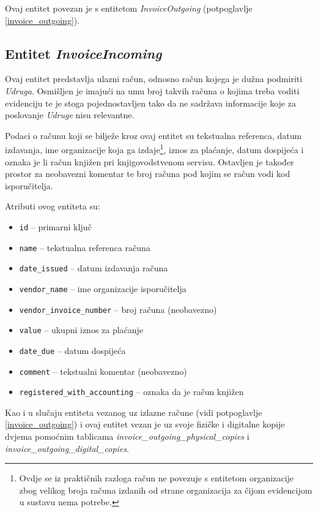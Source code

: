 \documentclass[times, utf8, diplomski]{fer}
\begin{document}
Ovaj entitet povezan je s entitetom \emph{InvoiceOutgoing} (potpoglavlje
\ref{invoice_outgoing}).

\subsection{Entitet \emph{InvoiceIncoming}} \label{invoice_incoming}

Ovaj entitet predstavlja ulazni račun, odnosno račun kojega je dužna podmiriti
\emph{Udruga}. Osmišljen je imajući na umu broj takvih računa o kojima treba
voditi evidenciju te je stoga pojednostavljen tako da ne sadržava informacije
koje za poslovanje \emph{Udruge} nisu relevantne.

Podaci o računu koji se bilježe kroz ovaj entitet su tekstualna referenca, datum
izdavanja, ime organizacije koja ga izdaje\footnote{Ovdje se iz praktičnih
    razloga račun ne povezuje s entitetom organizacije zbog velikog broja računa
    izdanih od strane organizacija za čijom evidencijom u sustavu nema potrebe.},
iznos za plaćanje, datum dospijeća i oznaka je li račun
knjižen pri knjigovodstvenom servisu. Ostavljen je također prostor za neobavezni
komentar te broj računa pod kojim se račun vodi kod isporučitelja.

\medskip
Atributi ovog entiteta su:
\begin{itemize}
    \item \texttt{id} -- primarni ključ
    \item \texttt{name} -- tekstualna referenca računa
    \item \texttt{date\_issued} -- datum izdavanja računa
    \item \texttt{vendor\_name} -- ime organizacije isporučitelja
    \item \texttt{vendor\_invoice\_number} -- broj računa (neobavezno)
    \item \texttt{value} -- ukupni iznos za plaćanje
    \item \texttt{date\_due} -- datum dospijeća
    \item \texttt{comment} -- tekstualni komentar (neobavezno)
    \item \texttt{registered\_with\_accounting} -- oznaka da je račun knjižen
\end{itemize}

Kao i u slučaju entiteta vezanog uz izlazne račune (vidi potpoglavlje
\ref{invoice_outgoing}) i ovaj entitet vezan je uz svoje fizičke i digitalne
kopije dvjema pomoćnim tablicama \emph{invoice\_outgoing\_physical\_copies} i
\emph{invoice\_outgoing\_digital\_copies}.
\end{document}
